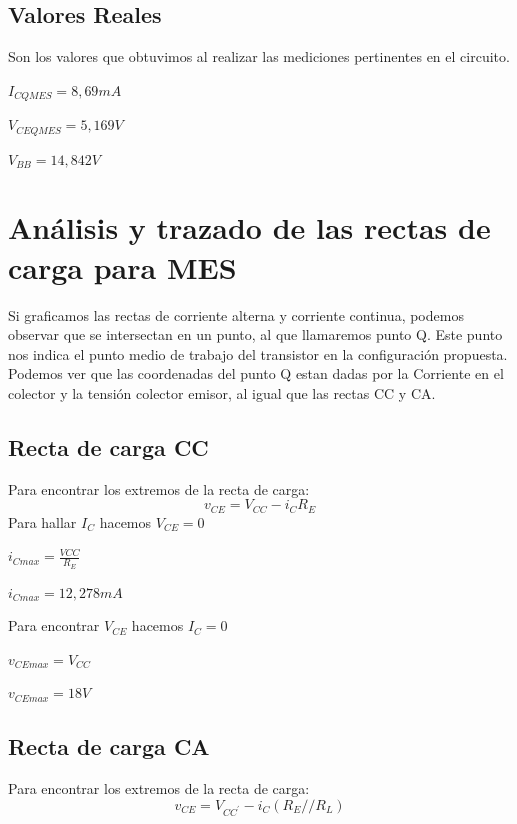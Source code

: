 \documentclass[12pt]{article}
\begin{document}
 
 



\subsection{Valores Reales}
Son los valores que obtuvimos al realizar las mediciones pertinentes en el circuito.
\begin{center}
  $I_{CQMES}=8,69mA$
  
  $V_{CEQMES}=5,169V$
  
  $V_{BB}=14,842V$
  

\end{center}

\section{Análisis y trazado de las rectas de carga para MES}
Si graficamos las rectas de corriente alterna y corriente continua, podemos observar que se intersectan en un punto, al que llamaremos punto Q. Este punto nos indica el punto medio de trabajo del transistor en la configuración propuesta. Podemos ver que las coordenadas del punto Q estan dadas por la Corriente en el colector y la tensión colector emisor, al igual que las rectas CC y CA.

\subsection{Recta de carga CC}
Para encontrar los extremos de la recta de carga:
\begin{equation}
  v_{CE}=V_{CC}-i_{C}R_E
\end{equation}
Para hallar $I_{C}$ hacemos $V_{CE}=0$
\begin{center}
  $i_{C max}=\frac{V{CC}}{R_E}$
  
  $i_{C max}=12,278mA$
\end{center}
Para encontrar $V_{CE}$ hacemos $I_C=0$
\begin{center}
  $v_{CE max}=V_{CC}$
  
  $v_{CE max}=18V$
\end{center}

 

\subsection{Recta de carga CA}

Para encontrar los extremos de la recta de carga:
\begin{equation}
  v_{CE}=V_{CC^{'}}-i_{C}(R_E//R_L)
\end{equation}
\end{document}
